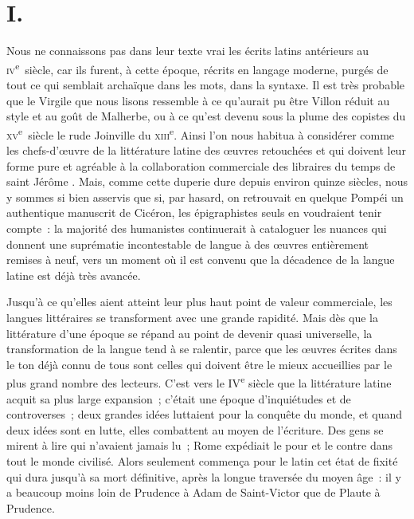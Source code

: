 \documentclass[french,twoside]{book} %
\begin{document}
\section[{I.}]{I.}
\noindent Nous ne connaissons pas dans leur texte vrai les écrits latins antérieurs au \textsc{iv}\textsuperscript{e} siècle, car ils furent, à cette époque, récrits en langage moderne, purgés de tout ce qui semblait archaïque dans les mots, dans la syntaxe. Il est très probable que le Virgile que nous lisons ressemble à ce qu’aurait pu être Villon réduit au style et au goût de Malherbe, ou à ce qu’est devenu sous la plume des copistes du \textsc{xv}\textsuperscript{e} siècle le rude Joinville du \textsc{xiii}\textsuperscript{e}. Ainsi l’on nous habitua à considérer comme les chefs-d’œuvre de la littérature latine des œuvres retouchées et qui doivent leur forme pure et agréable à la collaboration commerciale des libraires du temps de saint Jérôme . Mais, comme cette duperie dure depuis environ quinze siècles, nous y sommes si bien asservis que si, par hasard, on retrouvait en quelque Pompéi un authentique manuscrit de Cicéron, les épigraphistes seuls en voudraient tenir compte : la majorité des humanistes continuerait à cataloguer les nuances qui donnent une suprématie incontestable de langue à des œuvres entièrement remises à neuf, vers un moment où il est convenu que la décadence de la langue latine est déjà très avancée.\par
Jusqu’à ce qu’elles aient atteint leur plus haut point de valeur commerciale, les langues littéraires se transforment avec une grande rapidité. Mais dès que la littérature d’une époque se répand au point de devenir quasi universelle, la transformation de la langue tend à se ralentir, parce que les œuvres écrites dans le ton déjà connu de tous sont celles qui doivent être le mieux accueillies par le plus grand nombre des lecteurs. C’est vers le IV\textsuperscript{e} siècle que la littérature latine acquit sa plus large expansion ; c’était une époque d’inquiétudes et de controverses ; deux grandes idées luttaient pour la conquête du monde, et quand deux idées sont en lutte, elles combattent au moyen de l’écriture. Des gens se mirent à lire qui n’avaient jamais lu ; Rome expédiait le pour et le contre dans tout le monde civilisé. Alors seulement commença pour le latin cet état de fixité qui dura jusqu’à sa mort définitive, après la longue traversée du moyen âge : il y a beaucoup moins loin de Prudence à Adam de Saint-Victor que de Plaute à Prudence.\par
\end{document}

